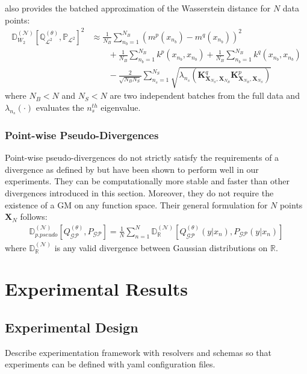 \documentclass{article}
\newcommand{\GP}{\operatorname{\mathcal{GP}}}
\numberwithin{equation}{section}
\begin{document}
\cite{wild2022generalized} also provides the batched approximation of the Wasserstein distance for $N$ data points:
\begin{align}
    \mathbb{D}_{W_2}^{(\mathcal{N})} \left[\mathbb{Q}^{(\theta)}_{\mathcal{L}^2}, \mathbb{P}_{\mathcal{L}^2}\right]^2 &\approx \frac{1}{N_B}\sum_{n_b=1}^{N_B} \left(m^p(x_{n_b}) - m^q(x_{n_b})\right)^2 \nonumber \\
    & \qquad + \frac{1}{N_B} \sum_{n_b=1}^{N_B} k^p(x_{n_b}, x_{n_b}) + \frac{1}{N_B} \sum_{n_b=1}^{N_B} k^q(x_{n_b}, x_{n_b}) \nonumber \\
    & \qquad - \frac{2}{\sqrt{N_B N_S}} \sum_{n_s=1}^{N_S} \sqrt{\lambda_{n_s}\left(\mathbf{K}^q_{\mathbf{X}_{N_S}, \mathbf{X}_{N_B}}\mathbf{K}^p_{\mathbf{X}_{N_B}, \mathbf{X}_{N_S}}\right)}
    \label{wasserstein-distance-approximation}
\end{align}
where $N_B < N$ and $N_S < N$ are two independent batches from the full data and $\lambda_{n_s}(\cdot)$ evaluates the $n_s^{th}$ eigenvalue. 

\subsubsection{Point-wise Pseudo-Divergences}
Point-wise pseudo-divergences do not strictly  satisfy the requirements of a divergence as defined by \cite{knoblauch2022optimization} but have been shown to perform well in our experiments. They can be computationally more stable and faster than other divergences introduced in this section. Moreover, they do not require the existence of a GM on any function space. Their general formulation for $N$ points $\mathbf{X}_N$ follows:
\begin{align}
    \mathbb{D}_{p. pseudo}^{(\mathcal{N})} \left[Q_{\GP}^{(\theta)}, P_{\GP}\right] = \frac{1}{N}\sum_{n=1}^N \mathbb{D}_{\mathbb{R}}^{(\mathcal{N})}\left[Q_{\GP}^{(\theta)}(y\vert x_n), P_{\GP}(y\vert x_n)\right]
\end{align}
where $\mathbb{D}_{\mathbb{R}}^{(\mathcal{N})}$ is any valid divergence between Gaussian distributions on $\mathbb{R}$. 

\newpage
\section{Experimental Results}
\subsection{Experimental Design}
Describe experimentation framework with resolvers and schemas so that experiments can be defined with yaml configuration files.
\end{document}
